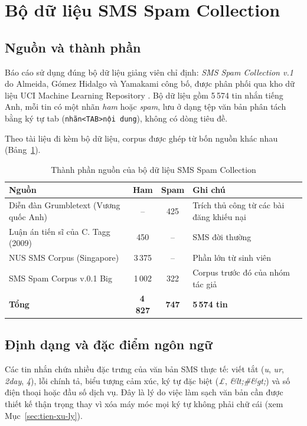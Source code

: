 \section{Bộ dữ liệu SMS Spam Collection}

\subsection{Nguồn và thành phần}

Báo cáo sử dụng đúng bộ dữ liệu giảng viên chỉ định: \textit{SMS Spam Collection v.1} do Almeida, Gómez Hidalgo và Yamakami công bố, được phân phối qua kho dữ liệu UCI Machine Learning Repository \cite{almeida2011}\cite{uci_sms}. Bộ dữ liệu gồm 5\,574 tin nhắn tiếng Anh, mỗi tin có một nhãn \textit{ham} hoặc \textit{spam}, lưu ở dạng tệp văn bản phân tách bằng ký tự tab (\texttt{nhãn<TAB>nội dung}), không có dòng tiêu đề.

Theo tài liệu đi kèm bộ dữ liệu, corpus được ghép từ bốn nguồn khác nhau (Bảng~\ref{tab:nguon-du-lieu}).

\begin{table}[H]
\centering
\caption{Thành phần nguồn của bộ dữ liệu SMS Spam Collection}
\label{tab:nguon-du-lieu}
\begin{tabular}{|p{6.2cm}|c|c|p{3.2cm}|}
\hline
\textbf{Nguồn} & \textbf{Ham} & \textbf{Spam} & \textbf{Ghi chú} \\
\hline
Diễn đàn Grumbletext (Vương quốc Anh) & -- & 425 & Trích thủ công từ các bài đăng khiếu nại \\
\hline
Luận án tiến sĩ của C. Tagg (2009) & 450 & -- & SMS đời thường \\
\hline
NUS SMS Corpus (Singapore) & 3\,375 & -- & Phần lớn từ sinh viên \\
\hline
SMS Spam Corpus v.0.1 Big & 1\,002 & 322 & Corpus trước đó của nhóm tác giả \\
\hline
\textbf{Tổng} & \textbf{4\,827} & \textbf{747} & \textbf{5\,574 tin} \\
\hline
\end{tabular}
\end{table}

\subsection{Định dạng và đặc điểm ngôn ngữ}

Các tin nhắn chứa nhiều đặc trưng của văn bản SMS thực tế: viết tắt (\textit{u}, \textit{ur}, \textit{2day}, \textit{4}), lỗi chính tả, biểu tượng cảm xúc, ký tự đặc biệt (\textit{£}, \textit{\&lt;\#\&gt;}) và số điện thoại hoặc đầu số dịch vụ. Đây là lý do việc làm sạch văn bản cần được thiết kế thận trọng thay vì xóa máy móc mọi ký tự không phải chữ cái (xem Mục~\ref{sec:tien-xu-ly}).

